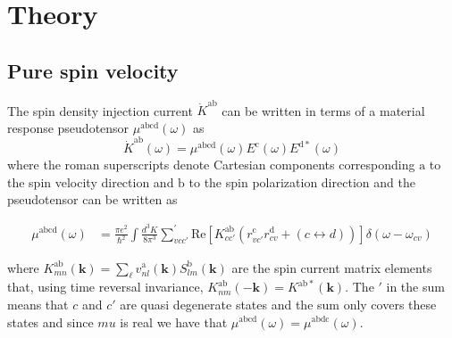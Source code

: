 \documentclass[prb,11pt,tightenlines,twocolumn,aps]{revtex4-1}
\begin{document}
\section{Theory} %
\label{sec:theory}




\subsection{Pure spin velocity} %
\label{sec:theory-pure_spin_current}

The spin density injection current $\dot{K}^{\mathrm{ab}}$ can be written in
terms of a material response pseudotensor $\mu^{\mathrm{abcd}}(\omega)$ as
\begin{equation*}
\dot{K}^{\mathrm{ab}}(\omega) = \mu^{\mathrm{abcd}}(\omega)
E^{\mathrm{c}}(\omega) E^{\mathrm{d*}}(\omega)
\label{eq:dotk}
\end{equation*}
where the roman superscripts denote Cartesian components corresponding
$\mathrm{a}$ to the spin velocity direction and $\mathrm{b}$ to the spin
polarization direction and the pseudotensor can be written as
\begin{widetext}
\begin{align}
\mu^{\mathrm{abcd}} (\omega) 
&=
\frac{\pi e^{2}}{\hbar^{2}} \int 
\frac{d^{3}K}{8 \pi^{3}}
\sum_{vcc'}^{'}
\mathrm{Re} \left[ K^{\mathrm{ab}}_{cc'} 
\left( 
r^{\mathrm{c}}_{vc'} 
r^{\mathrm{d}}_{cv } +
(c \leftrightarrow d)
\right) 
\right]
\delta(\omega-\omega_{cv})
\label{eq:mu}
\end{align}
\end{widetext}
where $K^{\mathrm{ab}}_{mn}(\mathbf{k}) =
\sum_{\ell}v^{\mathrm{a}}_{nl}(\mathbf{k}) S^{\mathrm{b}}_{lm}(\mathbf{k})$ are
the spin current matrix elements that, using time reversal invariance,
$K^{\mathrm{ab}}_{nm}(\mathbf{-k}) = K^{\mathrm{ab*}}(\mathbf{k}) $. The $'$ in
the sum means that $c$ and $c'$ are quasi degenerate states and the sum only
covers these states and since $mu$ is real we have that
$\mu^{\mathrm{abcd}}(\omega) = \mu^{\mathrm{abdc}}(\omega)$.
\end{document}
